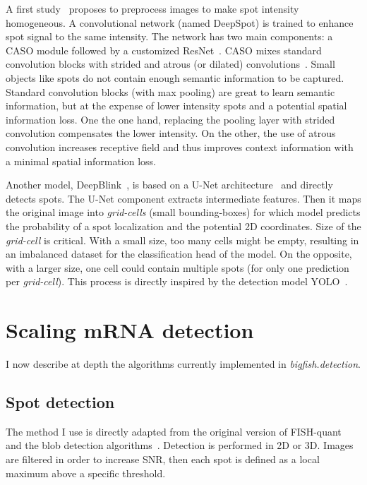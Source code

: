 A first study~\cite{bouilhol_deepspot_2022} proposes to preprocess images to make spot intensity homogeneous.
A convolutional network (named DeepSpot) is trained to enhance spot signal to the same intensity.
The network has two main components: a \ac{CASO} module followed by a customized ResNet~\cite{He_2016}.
\ac{CASO} mixes standard convolution blocks with strided and atrous (or dilated) convolutions~\cite{Hamaguchi_2018}.
Small objects like spots do not contain enough semantic information to be captured.
Standard convolution blocks (with max pooling) are great to learn semantic information, but at the expense of lower intensity spots and a potential spatial information loss.
One the one hand, replacing the pooling layer with strided convolution compensates the lower intensity.
On the other, the use of atrous convolution increases receptive field and thus improves context information with a minimal spatial information loss.

Another model, DeepBlink~\cite{eichenberger_deepblink_2021}, is based on a U-Net architecture~\cite{Ronneberger_2015} and directly detects spots.
The U-Net component extracts intermediate features.
Then it maps the original image into \emph{grid-cells} (small bounding-boxes) for which model predicts the probability of a spot localization and the potential 2D coordinates.
Size of the \emph{grid-cell} is critical.
With a small size, too many cells might be empty, resulting in an imbalanced dataset for the classification head of the model.
On the opposite, with a larger size, one cell could contain multiple spots (for only one prediction per \emph{grid-cell}).
This process is directly inspired by the detection model YOLO~\cite{Redmon_2016_CVPR}.

\section{Scaling mRNA detection}
\label{sec:method}

I now describe at depth the algorithms currently implemented in \emph{bigfish.detection}.

\subsection{Spot detection}
\label{subsec:spot_detection}

The method I use is directly adapted from the original version of FISH-quant~\cite{mueller_fish-quant_2013} and the blob detection algorithms~\cite{walt_scikit-image_2014}.
Detection is performed in 2D or 3D. Images are filtered in order to increase \ac{SNR}, then each spot is defined as a local maximum above a specific threshold.

